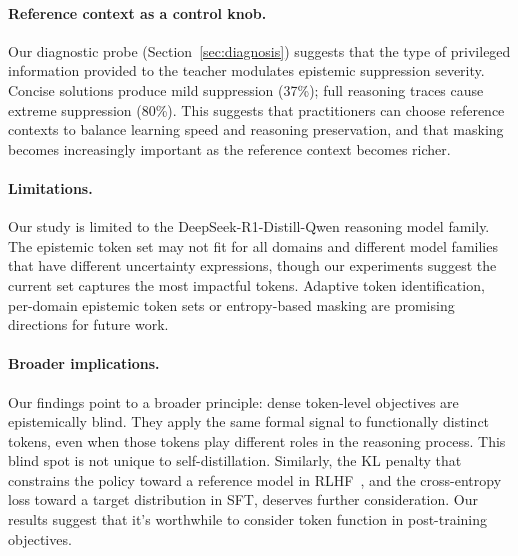 \documentclass[11pt]{article}
\begin{document}
\paragraph{Reference context as a control knob.}
Our diagnostic probe (Section~\ref{sec:diagnosis}) suggests that the type of privileged information provided to the teacher modulates epistemic suppression severity.
Concise solutions produce mild suppression (37\%); full reasoning traces cause extreme suppression (80\%).
This suggests that practitioners can choose reference contexts to balance learning speed and reasoning preservation, and that masking becomes increasingly important as the reference context becomes richer.

\paragraph{Limitations.}
Our study is limited to the DeepSeek-R1-Distill-Qwen reasoning model family.
The epistemic token set may not fit for all domains and different model families that have different uncertainty expressions, though our experiments suggest the current set captures the most impactful tokens.
Adaptive token identification, per-domain epistemic token sets or entropy-based masking are promising directions for future work.

\paragraph{Broader implications.}
Our findings point to a broader principle: dense token-level objectives are epistemically blind.
They apply the same formal signal to functionally distinct tokens, even when those tokens play different roles in the reasoning process.
This blind spot is not unique to self-distillation.
Similarly, the KL penalty that constrains the policy toward a reference model in RLHF~\cite{ziegler2019finetuning,stiennon2020learning,bai2022training}, and the cross-entropy loss toward a target distribution in SFT, deserves further consideration.
Our results suggest that it's worthwhile to consider token function in post-training objectives.


\end{document}
